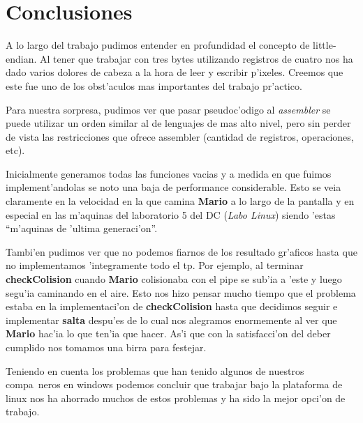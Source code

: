 \section{Conclusiones}
A lo largo del trabajo pudimos entender en profundidad el concepto de
little-endian. Al tener que trabajar con tres bytes utilizando registros de
cuatro nos ha dado varios dolores de cabeza a la hora de leer y escribir
p'ixeles. Creemos que este fue uno de los obst'aculos mas importantes del
trabajo pr'actico.

Para nuestra sorpresa, pudimos ver que pasar pseudoc'odigo al
\textit{assembler} se puede utilizar un orden similar al de lenguajes de mas
alto nivel, pero sin perder de vista las restricciones que ofrece assembler
(cantidad de registros, operaciones, etc).

Inicialmente generamos todas las funciones vacias y a medida en que fuimos
implement'andolas se noto una baja de performance considerable. Esto se veia
claramente en la velocidad en la que camina \textbf{Mario} a lo largo de la pantalla y
en especial en las m'aquinas del laboratorio 5 del DC (\textit{Labo Linux})
siendo 'estas ``m'aquinas de 'ultima generaci'on''.

Tambi'en pudimos ver que no podemos fiarnos de los resultado gr'aficos hasta
que no implementamos 'integramente todo el tp. Por ejemplo, al terminar
\textbf{checkColision} cuando \textbf{Mario} colisionaba con el pipe se sub'ia a 'este y luego
segu'ia caminando en el aire. Esto nos hizo pensar mucho tiempo que el
problema estaba en la implementaci'on de \textbf{checkColision} hasta que decidimos
seguir e implementar \textbf{salta} despu'es de lo cual nos alegramos
enormemente al ver que \textbf{Mario} hac'ia lo que ten'ia que hacer. As'i que con la
satisfacci'on del deber cumplido nos tomamos una birra para festejar.

Teniendo en cuenta los problemas que han tenido algunos de nuestros compa~neros
en windows podemos concluir que trabajar bajo la plataforma de linux nos ha
ahorrado muchos de estos problemas y ha sido la mejor opci'on de trabajo.

